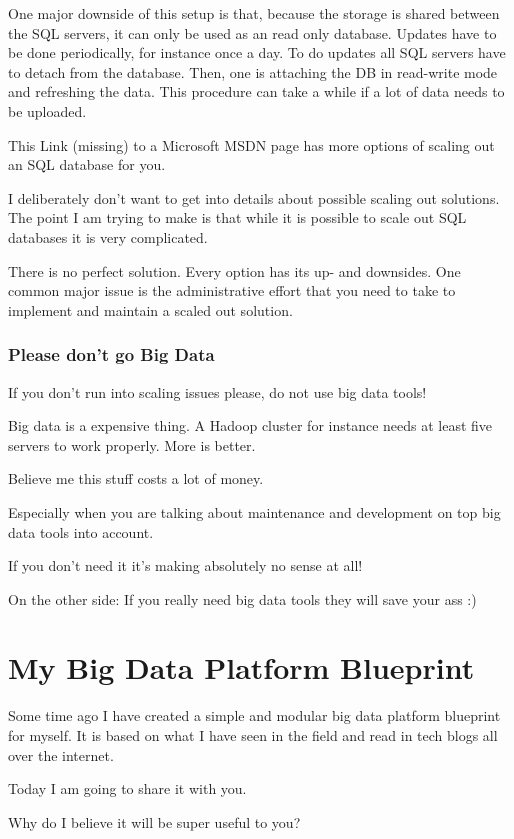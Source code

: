 \documentclass[12pt, numbers=noenddot]{scrreprt} %
\begin{document}
One major downside of this setup is that, because the storage is shared between the SQL servers, it can only be used as an read only database. Updates have to be done periodically, for instance once a day. To do updates all SQL servers have to detach from the database. Then, one is attaching the DB in read-write mode and refreshing the data. This procedure can take a while if a lot of data needs to be uploaded.

This Link (missing) to a Microsoft MSDN page has more options of scaling out an SQL database for you.

I deliberately don’t want to get into details about possible scaling out solutions. The point I am trying to make is that while it is possible to scale out SQL databases it is very complicated.

There is no perfect solution. Every option has its up- and downsides. One common major issue is the administrative effort that you need to take to implement and maintain a scaled out solution.

\subsection{Please don’t go Big Data}

If you don’t run into scaling issues please, do not use big data tools!

Big data is a expensive thing. A Hadoop cluster for instance needs at least five servers to work properly. More is better.

Believe me this stuff costs a lot of money.

Especially when you are talking about maintenance and development on top big data tools into account.

If you don’t need it it’s making absolutely no sense at all!

On the other side: If you really need big data tools they will save your ass :)

\chapter {My Big Data Platform Blueprint}
Some time ago I have created a simple and modular big data platform blueprint for myself. It is based on what I have seen in the field and read in tech blogs all over the internet.

Today I am going to share it with you.

Why do I believe it will be super useful to you?
\end{document}
